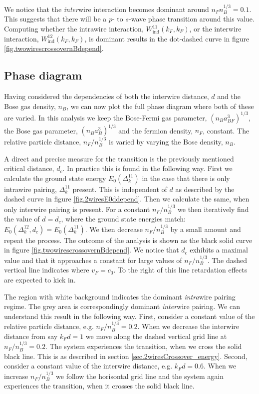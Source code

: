 We notice that the \textit{inter}wire interaction becomes dominant around $n_Fn_B^{1/3} = 0.1$. This suggests that there will be a $p$- to $s$-wave phase transition around this value. Computing whether the intrawire interaction, $W^{11}_{\text{ind}}(k_F,k_F)$, or the interwire interaction, $W^{12}_{\text{ind}}(k_F,k_F)$, is dominant results in the dot-dashed curve in figure \ref{fig.twowirescrossovernBdepend}. 

\subsection{Phase diagram} \label{subsec.phasediagram}
Having considered the dependencies of both the interwire distance, $d$ and the Bose gas density, $n_B$, we can now plot the full phase diagram where both of these are varied. In this analysis we keep the Bose-Fermi gas parameter, $(n_Ba_{BF}^3)^{1/3}$, the Bose gas parameter, $(n_Ba_B^3)^{1/3}$ and the fermion density, $n_F$, constant. The relative particle distance, $n_F / n_B^{1/3}$ is varied by varying the Bose density, $n_B$.  

A direct and precise measure for the transition is the previously mentioned critical distance, $d_c$. In practice this is found in the following way. First we calculate the ground state energy $E_0(\Delta^{11}_k)$ in the case that there is only intrawire pairing, $\Delta^{11}_k$ present. This is independent of $d$ as described by the dashed curve in figure \ref{fig.2wiresE0ddepend}. Then we calculate the same, when only interwire pairing is present. For a constant $n_F/n_B^{1/3}$ we then iteratively find the value of $d = d_c$, where the ground state energies match: $E_0(\Delta^{12}_k, d_c) = E_0(\Delta^{11}_k)$. We then decrease $n_F/n_B^{1/3}$ by a small amount and repeat the process. The outcome of the analysis is shown as the black solid curve in figure \ref{fig.twowirescrossovernBdepend}. We notice that $d_c$ exhibits a maximal value and that it approaches a constant for large values of $n_F/n_B^{1/3}$. The dashed vertical line indicates where $v_F = c_0$. To the right of this line retardation effects are expected to kick in. 

The region with white background indicates the dominant \textit{intra}wire pairing regime. The grey area is correspondingly dominant \textit{inter}wire pairing. We can understand this result in the following way. First, consider a constant value of the relative particle distance, e.g. $n_F/n_B^{1/3} = 0.2$. When we decrease the interwire distance from say $k_Fd = 1$ we move along the dashed vertical grid line at $n_F/n_B^{1/3} = 0.2$. The system experiences the transition, when we cross the solid black line. This is as described in section \ref{sec.2wiresCrossover_energy}. Second, consider a constant value of the interwire distance, e.g. $k_Fd = 0.6$. When we increase $n_F/n_B^{1/3}$ we follow the horisontal grid line and the system again experiences the transition, when it crosses the solid black line. 

